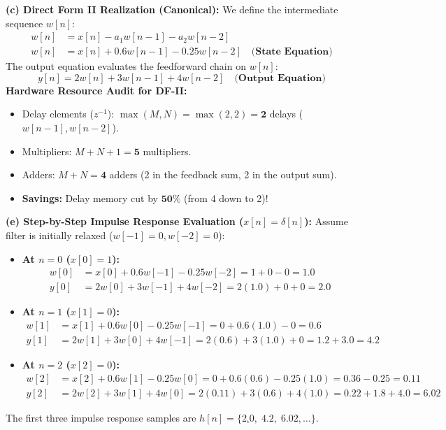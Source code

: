 \documentclass[11pt,a4paper]{article}
\begin{document}
\vspace{0.2cm}
\noindent\textbf{(c) Direct Form II Realization (Canonical):}
We define the intermediate sequence $w[n]$:
\begin{align}
w[n] &= x[n] - a_1 w[n-1] - a_2 w[n-2] \nonumber \\
w[n] &= x[n] + 0.6 w[n-1] - 0.25 w[n-2] \quad \textbf{(State Equation)}
\end{align}
The output equation evaluates the feedforward chain on $w[n]$:
\begin{equation}
y[n] = 2 w[n] + 3 w[n-1] + 4 w[n-2] \quad \textbf{(Output Equation)}
\end{equation}
\textbf{Hardware Resource Audit for DF-II:}
\begin{itemize}
    \item Delay elements ($z^{-1}$): $\max(M, N) = \max(2, 2) = \mathbf{2}$ delays ($w[n-1], w[n-2]$).
    \item Multipliers: $M + N + 1 = \mathbf{5}$ multipliers.
    \item Adders: $M + N = \mathbf{4}$ adders (2 in the feedback sum, 2 in the output sum).
    \item \textbf{Savings:} Delay memory cut by $\mathbf{50\%}$ (from 4 down to 2)!
\end{itemize}

\vspace{0.2cm}
\noindent\textbf{(e) Step-by-Step Impulse Response Evaluation ($x[n] = \delta[n]$):}
Assume filter is initially relaxed ($w[-1] = 0, w[-2] = 0$):
\begin{itemize}
    \item \textbf{At $n = 0$ ($x[0] = 1$):}
    \begin{align*}
    w[0] &= x[0] + 0.6 w[-1] - 0.25 w[-2] = 1 + 0 - 0 = \mathbf{1.0} \\
    y[0] &= 2 w[0] + 3 w[-1] + 4 w[-2] = 2(1.0) + 0 + 0 = \mathbf{2.0}
    \end{align*}
    \item \textbf{At $n = 1$ ($x[1] = 0$):}
    \begin{align*}
    w[1] &= x[1] + 0.6 w[0] - 0.25 w[-1] = 0 + 0.6(1.0) - 0 = \mathbf{0.6} \\
    y[1] &= 2 w[1] + 3 w[0] + 4 w[-1] = 2(0.6) + 3(1.0) + 0 = 1.2 + 3.0 = \mathbf{4.2}
    \end{align*}
    \item \textbf{At $n = 2$ ($x[2] = 0$):}
    \begin{align*}
    w[2] &= x[2] + 0.6 w[1] - 0.25 w[0] = 0 + 0.6(0.6) - 0.25(1.0) = 0.36 - 0.25 = \mathbf{0.11} \\
    y[2] &= 2 w[2] + 3 w[1] + 4 w[0] = 2(0.11) + 3(0.6) + 4(1.0) = 0.22 + 1.8 + 4.0 = \mathbf{6.02}
    \end{align*}
\end{itemize}
The first three impulse response samples are $h[n] = \{ \underline{2.0}, \; 4.2, \; 6.02, \dots \}$.
\end{document}
